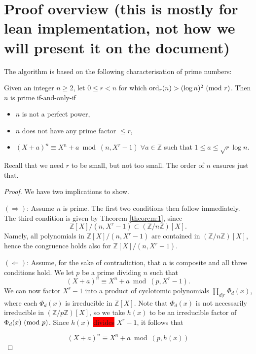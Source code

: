 \newpage

\section{Proof overview (this is mostly for lean implementation, not how we will present it on the document)}

The algorithm is based on the following characterisation of prime numbers:

\begin{proposition} \label{statement}

Given an integer $n \geq 2$, let $0 \leq r < n$ for which $\mbox{ord}_{r}(n) > (\log{n})^{2} \ (\mathrm{mod}\ r)$. Then $n$ is prime if-and-only-if

\begin{itemize}
 \item $n$ is not a perfect power,
 \item $n$ does not have any prime factor $\leq r$,
 \item $(X + a)^{n} \equiv X^{n} + a \bmod (n, X^{r} - 1)\; \forall a \in \mathbb{Z}$ such that $1 \leq a \leq \sqrt{r} \log{n}$.
\end{itemize}

\end{proposition}

\begin{remark}

Recall that we need $r$ to be small, but not too small. The order of $n$ ensures just that.

\end{remark}

\begin{proof}

We have two implications to show.

$(\Longrightarrow)$: Assume $n$ is prime. The first two conditions then follow immediately. The third condition is given by Theorem \ref{theorem:1}, since $$\mathbb{Z}[X]/(n, X^{r} - 1) \subset (\mathbb{Z}/n\mathbb{Z})[X].$$ Namely, all polynomials in $\mathbb{Z}[X]/(n, X^{r} - 1)$ are contained in $(\mathbb{Z}/n\mathbb{Z})[X]$, hence the congruence holds also for $\mathbb{Z}[X]/(n, X^{r} - 1)$.

$(\Longleftarrow)$: Assume, for the sake of contradiction, that $n$ is composite and all three conditions hold. We let $p$ be a prime dividing $n$ such that $$(X + a)^{n} \equiv X^{n} + a \bmod (p, X^{r} - 1).$$ We can now factor $X^{r} - 1$  into a product of cyclotomic polynomials $\prod_{d|r} \Phi_{d}(x)$, where each $\Phi_{d}(x)$ is irreducible in $\mathbb{Z}[X]$. Note that $\Phi_{d}(x)$ is not necessarily irreducible in $(\mathbb{Z}/p\mathbb{Z})[X]$, so we take $h(x)$ to be an irreducible factor of $\Phi_{d}(x) \ (\mathrm{mod}\ p)$. Since $h(x)$ \colorbox{red}{divides} $X^{r} - 1$, it follows that

\begin{equation*}
    (X + a)^{n} \equiv X^{n} + a \bmod (p, h(x))
\end{equation*}
    
\end{proof}

